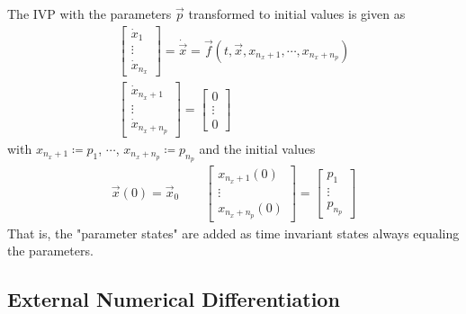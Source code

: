 			The IVP with the parameters \(\vec{p}\) transformed to initial values is given as
			\begin{align*}
				\begin{bmatrix}
					\dot{x}_1 \\
					\vdots    \\
					\dot{x}_{n_x}
				\end{bmatrix}
				= \dot{\vec{x}} = \vec{f}(t, \vec{x}, x_{n_x + 1}, \cdots, x_{n_x + n_p}) \\
				\begin{bmatrix}
					\dot{x}_{n_x + 1} \\
					\vdots            \\
					\dot{x}_{n_x + n_p}
				\end{bmatrix}
				=
				\begin{bmatrix}
					0      \\
					\vdots \\
					0
				\end{bmatrix}
			\end{align*}
			with \( x_{n_x + 1} \coloneqq p_1 \), \( \cdots \), \( x_{n_x + n_p} \coloneqq p_{n_p} \) and the initial values
			\begin{align*}
				\vec{x}(0) = \vec{x}_0 \qquad
				\begin{bmatrix}
					x_{n_x + 1}(0) \\
					\vdots         \\
					x_{n_x + n_p}(0)
				\end{bmatrix}
				=
				\begin{bmatrix}
					p_1    \\
					\vdots \\
					p_{n_p}
				\end{bmatrix}
			\end{align*}
			That is, the "parameter states" are added as time invariant states always equaling the parameters.

		\subsection{External Numerical Differentiation}
